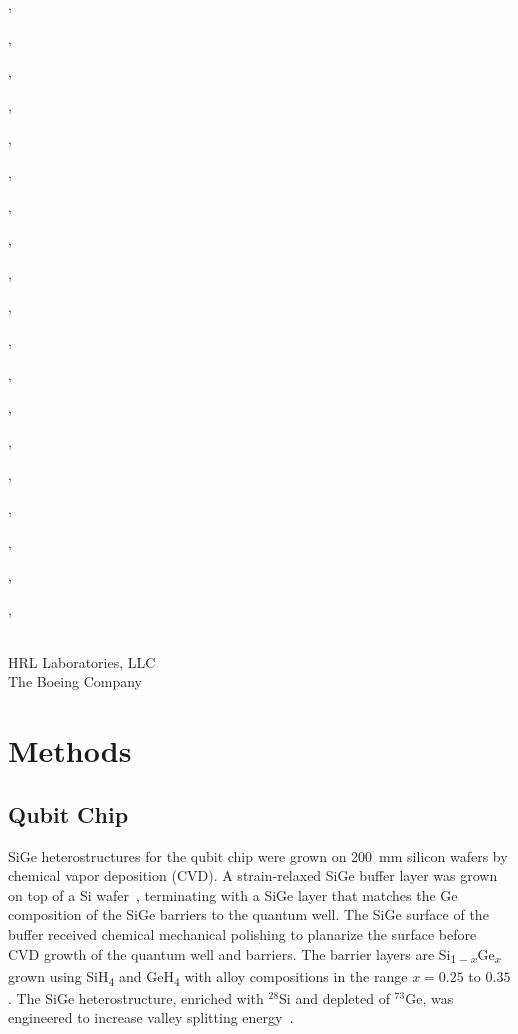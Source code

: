 \documentclass[aps,prl,twocolumn,superscriptaddress,nobibnotes,10pt,floatfix]{revtex4-2}
\newenvironment{widetext}{\vspace{2ex}}{\vspace{2ex}}
\begin{document}
\begin{widetext}
\author{Michael P. Walsh}{\HRL},
\author{Shuoqin Wang}{\HRL},
\author{Tong Wang}{\HRL},
\author{Daniel R. Ward}{\HRL},
\author{Aaron J. Weinstein}{\HRL},
\author{Terry B. Welch}{\HRL},
\author{Thomas V. Westrick}{\HRL},
\author{Evan T. White}{\HRL},
\author{Randall M. White}{\HRL},
\author{Samuel J. Whiteley}{\HRL},
\author{Gananath Wijeratne}{\HRL},
\author{Parker Williams}{\HRL},
\author{Jack T. Wilson}{\HRL},
\author{Courtney P. Wilt}{\HRL},
\author{Deborah E. Winklea}{\HRL},
\author{Onnik Yaglioglu}{\HRL},
\author{Daniel Yap}{\HRL},
\author{Clifford S. YoungSciortino}{\HRL},
\author{Daniel Zehnder}{\HRL},
\author{Andrew Ziegler}{\HRL}
\vspace{1ex}\\
\noindent {\HRL}HRL Laboratories, LLC
\\
\noindent {\Boeing}The Boeing Company
	\end{widetext}
	\fi

	\section{Methods}\label{methods-section}

	\subsection{Qubit Chip}\label{qubit-chip}

	SiGe heterostructures for the qubit chip were grown on 200~mm silicon wafers by chemical vapor deposition (CVD).
	A strain-relaxed SiGe buffer layer was grown on top of a Si wafer~\cite{deelman_metamorphic_2016}, terminating with a SiGe layer that matches the Ge composition of the SiGe barriers to the quantum well.
	The SiGe surface of the buffer received chemical mechanical polishing to planarize the surface before CVD growth of the quantum well and barriers.
	The barrier layers are Si\textsubscript{$1-x$}Ge\textsubscript{$x$} grown using SiH\textsubscript{4} and GeH\textsubscript{4} with alloy compositions in the range $x=0.25$ to $0.35$.
	The SiGe heterostructure, enriched with $^{28}$Si and depleted of $^{73}$Ge, was engineered to increase valley splitting energy~\cite{
		zhang_genetic_2013,
		marcks_valley_2025,
		mcjunkin_sige_2022,
		stehouwer_engineering_2025}.
\end{document}
